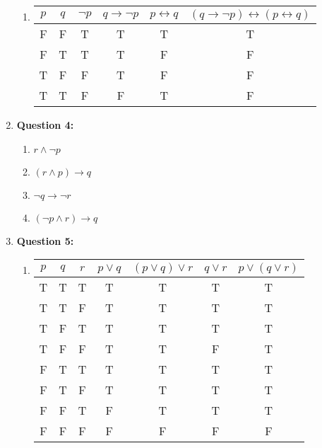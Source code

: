 \documentclass[11pt]{article}
\begin{document}
\begin{enumerate}
\begin{enumerate}[label=(\alph*)]
            \item
                \begin{tabular}{|c|c|c|c|c|c|}
                    \hline
                    $p$ & $q$ & $\lnot p$ & $q \rightarrow \lnot p$ & $p \leftrightarrow q$ & $(q \rightarrow \lnot p) \leftrightarrow (p \leftrightarrow q)$\\
                    \hline
                    F & F & T & T & T & T\\
                    F & T & T & T & F & F\\
                    T & F & F & T & F & F\\
                    T & T & F & F & T & F\\
                    \hline
                \end{tabular}
        \end{enumerate}
    
    \item
        \textbf{Question 4:}
            \begin{enumerate}[label=(\alph*)]
                \item
                $r \land \lnot p$
                
                \item
                $(r \land p) \rightarrow q$
                
                \item
                $\lnot q \rightarrow \lnot r$
                
                \item
                $(\lnot p \land r) \rightarrow q$
            \end{enumerate}
            
    \item
        \textbf{Question 5:}
            \begin{enumerate}[label=(\alph*)]
                \item 
                    \begin{tabular}{|c|c|c|c|c|c|c|}
                    \hline
                    $p$ & $q$ & $r$ & $p \lor q$ & $(p \lor q) \lor r$ & $q \lor r$ & $p\lor(q\lor r)$\\
                    \hline
                    T & T & T & T & T & T & T\\
                    T & T & F & T & T & T & T\\
                    T & F & T & T & T & T & T\\
                    T & F & F & T & T & F & T\\
                    F & T & T & T & T & T & T\\
                    F & T & F & T & T & T & T\\
                    F & F & T & F & T & T & T\\
                    F & F & F & F & F & F & F\\
                    \hline
                \end{tabular}
                

\end{enumerate}
\end{enumerate}
\end{document}
